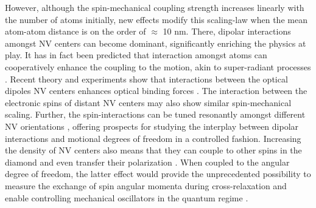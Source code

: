 \documentclass[preprintnumbers,amsmath,amssymb,superscriptaddress,twocolumn,showpacs]{revtex4-1}
\begin{document}
However, although the spin-mechanical coupling strength increases linearly with the number of atoms initially, new effects modify this scaling-law when the mean atom-atom distance is on the order of $\approx$ 10 nm. There, dipolar interactions amongst NV centers can become dominant, significantly enriching the physics at play. It has in fact been predicted that interaction amongst atoms can cooperatively enhance the coupling to the motion, akin to super-radiant processes \cite{Bachelard, PANAT}. 
Recent theory and experiments show that interactions between the optical dipoles NV centers enhances optical binding forces \cite{Venkatesh, Juan}. The interaction between the electronic spins of distant NV centers may also show similar spin-mechanical scaling. Further, the spin-interactions can be tuned resonantly amongst different NV orientations \cite{van_oort_cross-relaxation_1989}, offering prospects for studying the interplay between dipolar interactions and motional degrees of freedom in a controlled fashion. Increasing the density of NV centers also means that they can couple to other spins in the diamond \cite{armstrong_nvnv_2010, Alfasi, Epstein, Hall} and even transfer their polarization \cite{WangBajaj}.
When coupled to the angular degree of freedom, the latter effect would provide the unprecedented possibility to measure the exchange of spin angular momenta during cross-relaxation
and enable controlling mechanical oscillators in the quantum regime \cite{Zangara}.  

\end{document}
